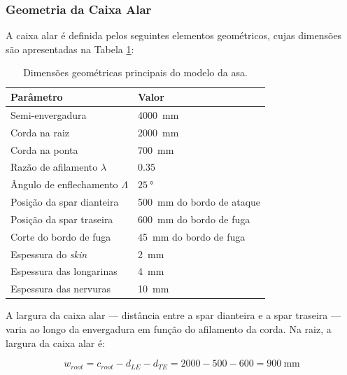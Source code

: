 \documentclass[a4paper,fleqn]{cas-sc}
\begin{document}
\subsubsection{Geometria da Caixa Alar}

A caixa alar é definida pelos seguintes elementos geométricos, cujas dimensões são apresentadas na Tabela \ref{tab:geom_caixa_alar}:

\begin{table}
\centering
\caption{Dimensões geométricas principais do modelo da asa.}
\label{tab:geom_caixa_alar}
\renewcommand{\arraystretch}{1.4}
\begin{tabularx}{\textwidth}{p{5.5cm} X}
\toprule
\textbf{Parâmetro} & \textbf{Valor} \\
\midrule
Semi-envergadura                    & \SI{4000}{\milli\meter} \\
Corda na raiz                       & \SI{2000}{\milli\meter} \\
Corda na ponta                      & \SI{700}{\milli\meter}  \\
Razão de afilamento $\lambda$       & $0.35$ \\
Ângulo de enflechamento $\Lambda$   & $\qty{25}{\degree}$ \\
Posição da spar dianteira           & \SI{500}{\milli\meter} do bordo de ataque \\
Posição da spar traseira            & \SI{600}{\milli\meter} do bordo de fuga \\
Corte do bordo de fuga              & \SI{45}{\milli\meter} do bordo de fuga \\
Espessura do \textit{skin}          & \SI{2}{\milli\meter} \\
Espessura das longarinas            & \SI{4}{\milli\meter}\footnotemark \\
Espessura das nervuras              & \SI{10}{\milli\meter} \\
\bottomrule
\end{tabularx}
\end{table}

A largura da caixa alar --- distância entre a spar dianteira e a spar traseira --- varia ao longo da envergadura em função do afilamento da corda. Na raiz, a largura da caixa alar é:

\begin{equation}
    w_{root} = c_{root} - d_{LE} - d_{TE} = 
    2000 - 500 - 600 = \SI{900}{\milli\meter}
    \label{eq:largura_caixa_raiz}
\end{equation}
\end{document}
